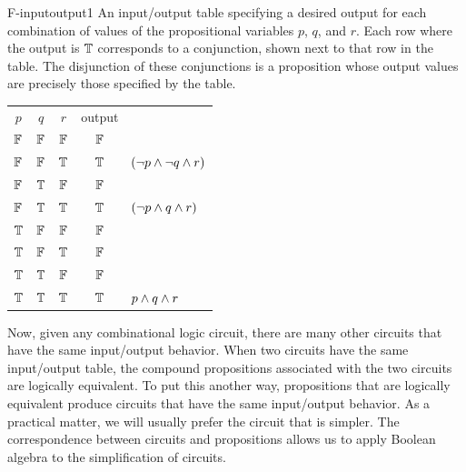 \fig
   {F-inputoutput1}
   {An input/output table specifying a desired output for each
    combination of values of the propositional variables $p$,
    $q$, and $r$.  Each row where the output is $\mathbb{T}$ corresponds to
    a conjunction, shown next to that row in the table.  The
    disjunction of these conjunctions is a proposition whose
    output values are precisely those specified by the table.}
   {\begin{tabular}{|c|c|c||c|l}
       \cline{1-4}
       \strut $p$&  $q$&  $r$& output& \\
       \cline{1-4}
       \strut $\mathbb{F}$& $\mathbb{F}$& $\mathbb{F}$& $\mathbb{F}$& \\
       \cline{1-4}
       \strut $\mathbb{F}$& $\mathbb{F}$& $\mathbb{T}$& $\mathbb{T}$& $(\lnot p\wedge\lnot q\wedge r)$\\
       \cline{1-4}
       \strut $\mathbb{F}$& $\mathbb{T}$& $\mathbb{F}$& $\mathbb{F}$& \\
       \cline{1-4}
       \strut $\mathbb{F}$& $\mathbb{T}$& $\mathbb{T}$& $\mathbb{T}$& $(\lnot p\wedge q\wedge r)$\\
       \cline{1-4}
       \strut $\mathbb{T}$& $\mathbb{F}$& $\mathbb{F}$& $\mathbb{F}$& \\
       \cline{1-4}
       \strut $\mathbb{T}$& $\mathbb{F}$& $\mathbb{T}$& $\mathbb{F}$& \\
       \cline{1-4}
       \strut $\mathbb{T}$& $\mathbb{T}$& $\mathbb{F}$& $\mathbb{F}$& \\
       \cline{1-4}
       \strut $\mathbb{T}$& $\mathbb{T}$& $\mathbb{T}$& $\mathbb{T}$& $p\wedge q\wedge r$\\
       \cline{1-4}
    \end{tabular}
   }
   
\medbreak

Now, given any combinational logic circuit, there are many
other circuits that have the same input/output behavior. 
When two circuits have the same input/output table,
the compound propositions associated with
the two circuits are logically equivalent.  To put this another
way, propositions that are logically equivalent produce circuits
that have the same input/output behavior.  As a practical matter,
we will usually prefer the circuit that is simpler.  The
correspondence between circuits and propositions allows us
to apply Boolean algebra
to the simplification of circuits.

